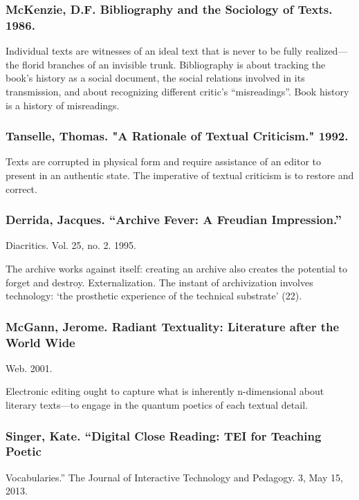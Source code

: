 \documentclass[11pt]{article}
\begin{document}
\subsubsection{McKenzie, D.F. Bibliography and the Sociology of Texts. 1986.}
\label{sec:org669aa82}

Individual texts are witnesses of an ideal text that is never to be
fully realized---the florid branches of an invisible trunk.
Bibliography is about tracking the book’s history as a social
document, the social relations involved in its transmission, and about
recognizing different critic’s “misreadings”. Book history is a
history of misreadings.

\subsubsection{Tanselle, Thomas. "A Rationale of Textual Criticism." 1992.}
\label{sec:org289871b}

Texts are corrupted in physical form and require assistance of an
editor to present in an authentic state. The imperative of textual
criticism is to restore and correct.

\subsubsection{Derrida, Jacques. “Archive Fever: A Freudian Impression.”}
\label{sec:org3c97672}
Diacritics. Vol. 25, no. 2. 1995.

The archive works against itself: creating an archive also creates the
potential to forget and destroy. Externalization.  The instant of
archivization involves technology: ‘the prosthetic experience of the
technical substrate’ (22).

\subsubsection{McGann, Jerome. Radiant Textuality: Literature after the World Wide}
\label{sec:org6b07aab}
Web. 2001.

Electronic editing ought to capture what is inherently n-dimensional
about literary texts---to engage in the quantum poetics of each
textual detail.

\subsubsection{Singer, Kate. “Digital Close Reading: TEI for Teaching Poetic}
\label{sec:orgc45c234}
Vocabularies.” The Journal of Interactive Technology and Pedagogy. 3,
May 15, 2013.
\end{document}

